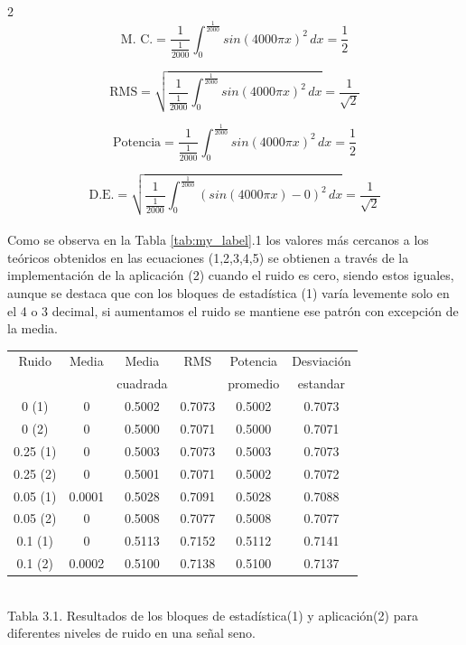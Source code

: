 \documentclass{journal}[IEEEtran, twocolumn]
\begin{document}
\begin{multicols}{2}
\begin{equation}
    \text{M. C.}=\frac{1}{\frac{1}{2000}}\int_{0}^{\frac{1}{2000}} sin( 4000 \pi x)^2 \,dx = \frac{1}{2}
\end{equation}

\begin{equation}
    \text{RMS}=\sqrt{\frac{1}{\frac{1}{2000}}\int_{0}^{\frac{1}{2000}} sin( 4000 \pi x)^2 \,dx} = \frac{1}{\sqrt{2}}
\end{equation}

\begin{equation}
    \text{Potencia}=\frac{1}{\frac{1}{2000}}\int_{0}^{\frac{1}{2000}} sin( 4000 \pi x)^2 \,dx= \frac{1}{2}
\end{equation}

\begin{equation}
    \text{D.E.}=\sqrt{\frac{1}{\frac{1}{2000}}\int_{0}^{\frac{1}{2000}} \left(sin( 4000 \pi x) - 0 \right)^2\,dx}= \frac{1}{\sqrt{2}}   
\end{equation}\\
\noindent
Como se observa en la Tabla \ref{tab:my_label}.1 los valores más cercanos a los teóricos obtenidos en las ecuaciones (1,2,3,4,5) se obtienen a través de la implementación de la aplicación (2) cuando el ruido es cero, siendo estos iguales, aunque se destaca que con los bloques de estadística (1) varía levemente solo en el 4 o 3 decimal, si aumentamos el ruido se mantiene ese patrón con excepción de la media.
\\

      { \scriptsize
      \centering
        \begin{tabular}{|c|c|c|c|c|c|} 
             \hline
            Ruido & Media & Media & RMS &Potencia& Desviación \\ 
             &  &cuadrada& & promedio  &estandar \\ \hline
           0 (1)  & 0  &  0.5002 & 0.7073 &0.5002 &0.7073 \\ \hline
           0 (2)   & 0 & 0.5000 &  0.7071& 0.5000& 0.7071\\ \hline
           0.25 (1)  & 0  & 0.5003& 0.7073 &0.5003 &0.7073 \\ \hline
           0.25 (2)   & 0 & 0.5001&  0.7071& 0.5002& 0.7072\\ \hline
           0.05 (1)  &0.0001  & 0.5028 &  0.7091& 0.5028 & 0.7088\\ \hline
           0.05 (2) &0  & 0.5008 &  0.7077& 0.5008 &0.7077 \\ \hline
           0.1 (1)  & 0 &0.5113 & 0.7152 & 0.5112 &0.7141 \\ \hline
           0.1 (2) &  0.0002& 0.5100 & 0.7138& 0.5100 & 0.7137\\ \hline
        \end{tabular}
        \\Tabla 3.1. Resultados de los bloques de estadística(1) y aplicación(2) para diferentes niveles de ruido en una señal seno.
        \label{tab:my_label}
}
    \\



\end{multicols}
\end{document}
